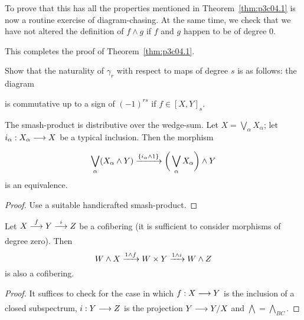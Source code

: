 \documentclass[../main]{subfiles}
\begin{document}
To prove that this has all the properties mentioned in Theorem~\ref{thm:p3c04.1} is now a routine exercise of diagram-chasing. At the same time, we check that we have not altered the definition of $f \wedge g$ if $f$ and $g$ happen to be of degree $0$. 


This completes the proof of Theorem~\ref{thm:p3c04.1}.

\begin{exercise}
Show that the naturality of $\gamma_r$ with respect to maps of degree $s$ is as follows: the diagram 

\begin{center}
\end{center}

is commutative up to a sign of $(-1)^{rs}$ if $f \in [X, Y]_s$.
\end{exercise}

\begin{proposition}\label{prop:p3ch04.11}
The smash-product is distributive over the wedge-sum. Let $X = \bigvee_\alpha X_\alpha$; let $i_\alpha : X_\alpha \lar{} X$ be a typical inclusion. Then the morphism \[\bigvee_\alpha (X_\alpha \wedge Y) \vra{\{i_\alpha \wedge 1\}} \bigg(\bigvee_\alpha X_\alpha\bigg) \wedge Y\] is an equivalence. 
\end{proposition}

\begin{proof}
Use a suitable handicrafted smash-product. 
\end{proof}

\begin{proposition}\label{prop:p3ch04.12}
Let $X \lar{f} Y \lar{i} Z$ be a cofibering (it is sufficient to consider morphisms of degree zero). Then \[W \wedge X \vra{1 \wedge f} W \times Y \vra{1 \wedge i} W \wedge Z\] is also a cofibering.
\end{proposition}

\begin{proof}
It suffices to check for the case in which $f : X \lar{} Y$ is the inclusion of a closed subspectrum, $i : Y \lar{} Z$ is the projection $Y \lar {} Y/X$ and $\bigwedge = \bigwedge_{BC}$.
\end{proof}
\end{document}
